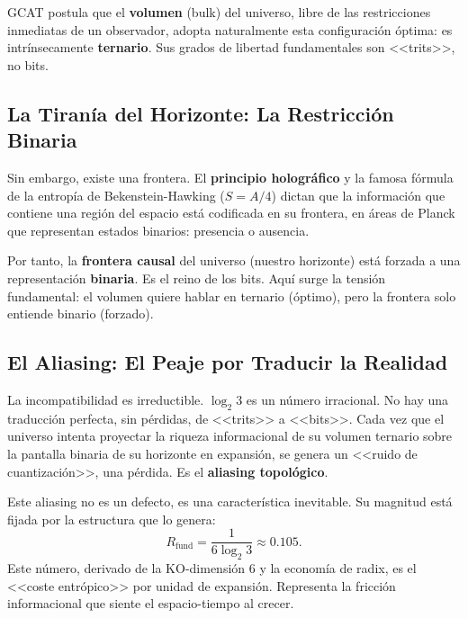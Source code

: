 \documentclass[12pt, a4paper]{article}
\begin{document}
GCAT postula que el \textbf{volumen} (bulk) del universo, libre de las restricciones inmediatas de un observador, adopta naturalmente esta configuración óptima: es intrínsecamente \textbf{ternario}. Sus grados de libertad fundamentales son <<trits>>, no bits.

\subsection{La Tiranía del Horizonte: La Restricción Binaria}

Sin embargo, existe una frontera. El \textbf{principio holográfico} y la famosa fórmula de la entropía de Bekenstein-Hawking ($S = A/4$) dictan que la información que contiene una región del espacio está codificada en su frontera, en áreas de Planck que representan estados binarios: presencia o ausencia.

Por tanto, la \textbf{frontera causal} del universo (nuestro horizonte) está forzada a una representación \textbf{binaria}. Es el reino de los bits. Aquí surge la tensión fundamental: el volumen quiere hablar en ternario (óptimo), pero la frontera solo entiende binario (forzado).

\subsection{El Aliasing: El Peaje por Traducir la Realidad}

La incompatibilidad es irreductible. $\log_2 3$ es un número irracional. No hay una traducción perfecta, sin pérdidas, de <<trits>> a <<bits>>. Cada vez que el universo intenta proyectar la riqueza informacional de su volumen ternario sobre la pantalla binaria de su horizonte en expansión, se genera un <<ruido de cuantización>>, una pérdida. Es el \textbf{aliasing topológico}.

Este aliasing no es un defecto, es una característica inevitable. Su magnitud está fijada por la estructura que lo genera:
\begin{equation}
R_{\text{fund}} = \frac{1}{6 \log_2 3} \approx 0.105.
\end{equation}
Este número, derivado de la KO-dimensión 6 y la economía de radix, es el <<coste entrópico>> por unidad de expansión. Representa la fricción informacional que siente el espacio-tiempo al crecer.

\end{document}
